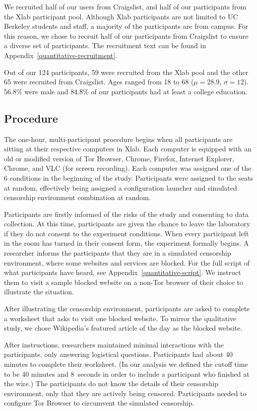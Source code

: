\documentclass[USenglish,oneside,twocolumn]{article}
\begin{document}
We recruited half of our users from Craigslist, and half of our participants from 
the Xlab participant pool. Although Xlab participants are not limited to UC Berkeley students and staff,
a majority of the participants are from campus. For this reason, we chose to recruit 
half of our participants from Craigslist to ensure a diverse set of participants. 
The recruitment text can be found in Appendix~\ref{quantitative-recruitment}. 

Out of our 124 participants, 59 were recruited from the Xlab pool and the other 65 were
recruited from Craigslist. Ages ranged from 18 to 68
($\mu = 28.9$, $\sigma = 12$). 56.8\% were male and 
84.8\% of our participants had at least a college education.

\subsection{Procedure}
The one-hour, multi-participant procedure begins when all participants are sitting at their
respective computers in Xlab. Each computer is equipped with an old or modified version
of Tor Browser, Chrome, Firefox, Internet Explorer,  Chrome, and VLC (for screen recording).
Each computer was assigned one of the 6 conditions in the beginning of the study. Participants
were assigned to the seats at random, effectively being assigned a configuration launcher and
simulated censorship environment combination at random. 

Participants are firstly informed of the risks of the study and consenting to data collection.  At
this time, participants are given the chance to leave the laboratory if they do not consent to 
the experiment conditions. When every participant left in the room has turned in their consent
form, the experiment formally begins. A researcher informs the participants that they are in a
simulated censorship environment, where some websites and services are blocked. 
For the full script of what participants have heard, see Appendix~\ref{quantitative-script}. We
instruct them to visit a sample blocked website on a non-Tor browser of their choice to illustrate 
the situation.

After illustrating the censorship environment, participants are asked to 
complete a worksheet that asks to visit one blocked website. 
To mirror the qualitative study, we chose Wikipedia's featured article of the day 
as the blocked website. 

After instructions, researchers maintained minimal interactions with the participants, 
only answering logistical questions. Participants had
about 40 minutes to complete their worksheet.
(In our analysis we defined the cutoff time to be 40 minutes and 8~seconds
in order to include a participant who finished at the wire.)
The participants do not know the details of their censorship environment,
only that they are actively being censored. Participants needed to configure Tor Browser to 
circumvent the simulated censorship. 
\end{document}
